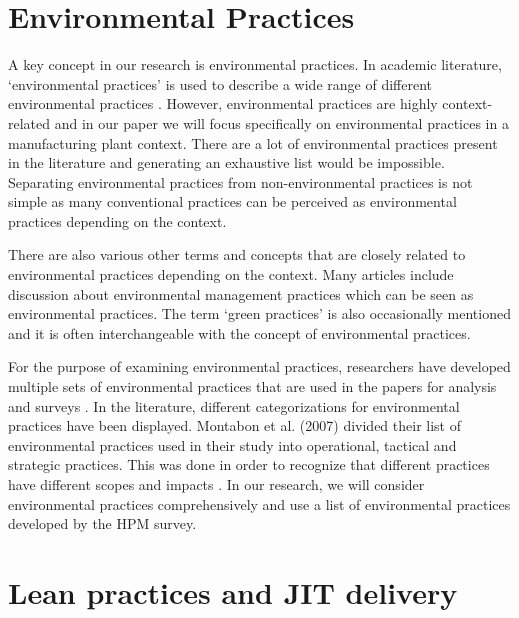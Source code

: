 \section{Environmental Practices}
A key concept in our research is environmental practices. 
In academic literature, ‘environmental practices’ is used to describe a wide range of different environmental practices \citep{montabonExaminationCorporateReporting2007}. 
However, environmental practices are highly context-related and in our paper we will focus specifically on environmental practices in a manufacturing plant context. 
There are a lot of environmental practices present in the literature and generating an exhaustive list would be impossible. 
Separating environmental practices from non-environmental practices is not simple as many conventional practices can be perceived as environmental practices depending on the context.

There are also various other terms and concepts that are closely related to environmental practices depending on the context. 
Many articles include discussion about environmental management practices which can be seen as environmental practices. 
The term ‘green practices’ is also occasionally mentioned and it is often interchangeable with the concept of environmental practices.

For the purpose of examining environmental practices, researchers have developed multiple sets of environmental practices that are used in the papers for analysis and surveys \citep{montabonExaminationCorporateReporting2007, zhuRelationshipsOperationalPractices2004}. 
In the literature, different categorizations for environmental practices have been displayed. 
Montabon et al. (2007) divided their list of environmental practices used in their study into operational, tactical and strategic practices. 
This was done in order to recognize that different practices have different scopes and impacts \citep{montabonExaminationCorporateReporting2007}. 
In our research, we will consider environmental practices comprehensively and use a list of environmental practices developed by the HPM survey.
\section{Lean practices and JIT delivery}
